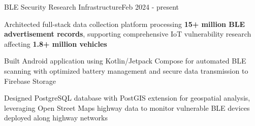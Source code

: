 \begin{joblong}{BLE Security Research Infrastructure}{Feb 2024 - present}
	\item Architected full-stack data collection platform processing \textbf{15+ million BLE advertisement records}, supporting comprehensive IoT vulnerability research affecting \textbf{1.8+ million vehicles}
	\item Built Android application using Kotlin/Jetpack Compose for automated BLE scanning with optimized battery management and secure data transmission to Firebase Storage
	\item Designed PostgreSQL database with PostGIS extension for geospatial analysis, leveraging Open Street Maps highway data to monitor vulnerable BLE devices deployed along highway networks
\end{joblong}
